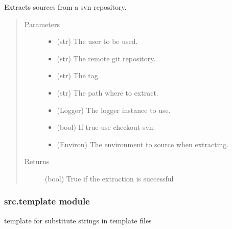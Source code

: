 \documentclass[a4paper,10pt,english]{sphinxmanual}
\begin{document}
\begin{fulllineitems}
\label{\detokenize{apidoc_src/src:src.system.svn_extract}}
Extracts sources from a svn repository.
\begin{quote}\begin{description}
\item[{Parameters}] \leavevmode\begin{itemize}
\item {} 
 \textendash{} (str) The user to be used.

\item {} 
 \textendash{} (str) The remote git repository.

\item {} 
 \textendash{} (str) The tag.

\item {} 
 \textendash{} (str) The path where to extract.

\item {} 
 \textendash{} (Logger) The logger instance to use.

\item {} 
 \textendash{} (bool) If true use checkout svn.

\item {} 
 \textendash{} (Environ)
The environment to source when extracting.

\end{itemize}

\item[{Returns}] \leavevmode
(bool) True if the extraction is successful

\end{description}\end{quote}

\end{fulllineitems}



\subsubsection{src.template module}
\label{\detokenize{apidoc_src/src:module-src.template}}\label{\detokenize{apidoc_src/src:src-template-module}}
template for substitute strings in template files
\end{document}
